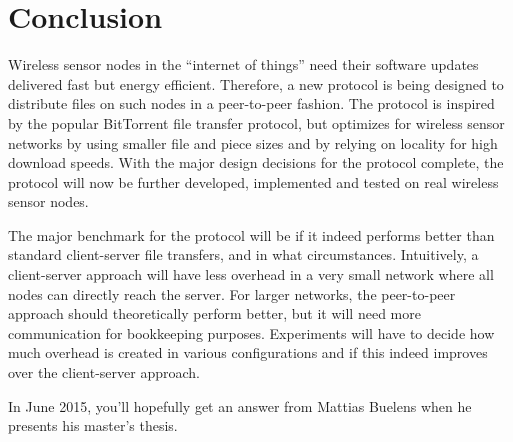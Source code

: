 \documentclass[ DIV=calc,%
                paper=a4,%
                fontsize=12pt,%
                twocolumn%
              ]{scrartcl}	 			%
\newcommand{\Author}{Mattias Buelens}
\begin{document}

\section*{Conclusion}
Wireless sensor nodes in the ``internet of things'' need their software updates delivered fast but energy efficient. Therefore, a new protocol is being designed to distribute files on such nodes in a peer-to-peer fashion. The protocol is inspired by the popular BitTorrent file transfer protocol, but optimizes for wireless sensor networks by using smaller file and piece sizes and by relying on locality for high download speeds. With the major design decisions for the protocol complete, the protocol will now be further developed, implemented and tested on real wireless sensor nodes.

The major benchmark for the protocol will be if it indeed performs better than standard client-server file transfers, and in what circumstances. Intuitively, a client-server approach will have less overhead in a very small network where all nodes can directly reach the server. For larger networks, the peer-to-peer approach should theoretically perform better, but it will need more communication for bookkeeping purposes. Experiments will have to decide how much overhead is created in various configurations and if this indeed improves over the client-server approach.

In June 2015, you'll hopefully get an answer from \Author{} when he presents his master's thesis.

\clearpage
\onecolumn

\begin{flushleft}


\end{flushleft}
\end{document}

